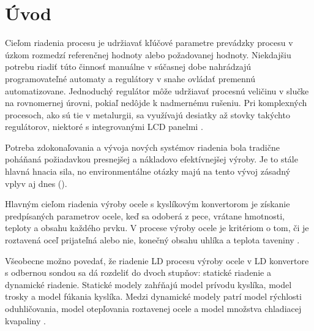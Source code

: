 \documentclass[]{tukediphc}
\begin{document}
\renewcommand\theHfigure{\theHsection.\arabic{figure}}
\renewcommand\theHtable{\theHsection.\arabic{table}}


\prvastrana


\thispagestyle{empty}
\tableofcontents
\newpage
%
%


\setcounter{page}{1}
\setcounter{equation}{0}
\setcounter{figure}{0}
\setcounter{table}{0}

\section{Úvod}

Cieľom riadenia procesu je udržiavať kľúčové parametre prevádzky procesu v úzkom rozmedzí referenčnej hodnoty alebo požadovanej hodnoty. Niekdajšiu potrebu riadiť túto činnosť manuálne v súčasnej dobe nahrádzajú programovateľné automaty a regulátory v snahe ovládať premennú automatizovane. Jednoduchý regulátor môže udržiavať procesnú veličinu v slučke na rovnomernej úrovni, pokiaľ nedôjde k nadmernému rušeniu. Pri komplexných procesoch, ako sú tie v metalurgii, sa využívajú desiatky až stovky takýchto regulátorov, niektoré s integrovanými LCD panelmi \citep{Al-Megren2016}.

Potreba zdokonaľovania a vývoja nových systémov riadenia bola tradične poháňaná požiadavkou presnejšej a nákladovo efektívnejšej výroby. Je to stále hlavná hnacia sila, no environmentálne otázky majú na tento vývoj zásadný vplyv aj dnes (\cite{Widlund1998}).

Hlavným cieľom riadenia výroby ocele s kyslíkovým konvertorom je získanie predpísaných parametrov ocele, keď sa odoberá z pece, vrátane hmotnosti, teploty a obsahu každého prvku. V procese výroby ocele je kritériom o tom, či je roztavená oceľ prijateľná alebo nie, konečný obsahu uhlíka a teplota taveniny \cite{Wang2010}.

Všeobecne možno povedať, že riadenie LD procesu výroby ocele v LD konvertore s odbernou sondou sa dá rozdeliť do dvoch stupňov: statické riadenie a dynamické riadenie. Statické modely zahŕňajú model prívodu kyslíka, model trosky a model fúkania kyslíka. Medzi dynamické modely patrí model rýchlosti oduhličovania, model otepľovania roztavenej ocele a model množstva chladiacej kvapaliny \cite{Wang2010}.
\end{document}
